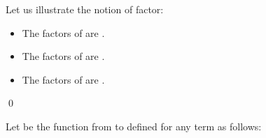 \documentclass[a4paper]{llncs}
\begin{document}
  \begin{example}\label{ex factor term}
    Let us illustrate the notion of factor:
      \begin{itemize}
         \item The factors of  are .    
         \item The factors of  are .
         \item The factors of  are . 
     \end{itemize}
    \qed
  \end{example}
  
  
  \begin{definition}[ Function]
     Let  be the function from  to  defined for any term  as follows: 
        
  \end{definition}
  
\end{document}
